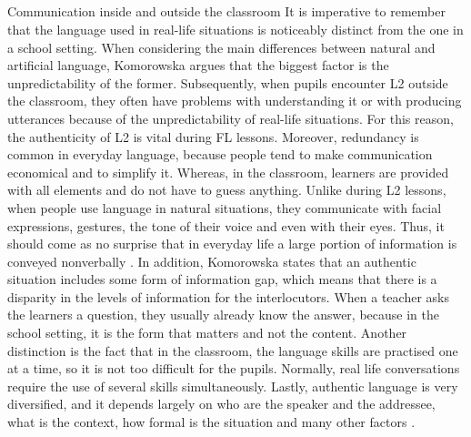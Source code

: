 \documentclass{article}
\begin{document}
\subsection{}
Communication inside and outside the classroom
It is imperative to remember that the language used in real-life situations is noticeably distinct from the one in a school setting. When considering the main differences between natural and artificial language, Komorowska argues that the biggest factor is the unpredictability of the former. Subsequently, when pupils encounter L2 outside the classroom, they often have problems with understanding it or with producing utterances because of the unpredictability of real-life situations. For this reason, the authenticity of L2 is vital during FL lessons. Moreover, redundancy is common in everyday language, because people tend to make communication economical and to simplify it. Whereas, in the classroom, learners are provided with all elements and do not have to guess anything. Unlike during L2 lessons, when people use language in natural situations, they communicate with facial expressions, gestures, the tone of their voice and even with their eyes. Thus, it should come as no surprise that in everyday life a large portion of information is conveyed nonverbally \cite{komorowska_podstawy_1993}. 
In addition, Komorowska states that an authentic situation includes some form of information gap, which means that there is a disparity in the levels of information for the interlocutors. When a teacher asks the learners a question, they usually already know the answer, because in the school setting, it is the form that matters and not the content. Another distinction is the fact that in the classroom, the language skills are practised one at a time, so it is not too difficult for the pupils. Normally, real life conversations require the use of several skills simultaneously. Lastly, authentic language is very diversified, and it depends largely on who are the speaker and the addressee, what is the context, how formal is the situation and many other factors \cite{komorowska_podstawy_1993}.


\medskip
\clearpage

\printbibliography[
heading=bibintoc,
title={Whole bibliography}
]
\end{document}
